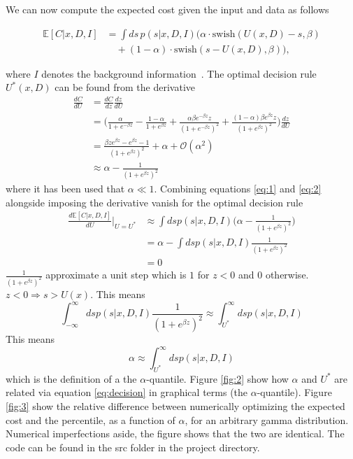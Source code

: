 \documentclass[a4paper,12pt]{article}
\theoremstyle{definition}
\begin{document}
	We can now compute the expected cost given the input and data as follows
	
	\begin{equation}
		\begin{split}
			\mathbb{E}[C | x, D, I] & = \int ds \, p(s | x, D, I) \bigg( \alpha \cdot \text{swish}(U(x,D) - s, \beta) \\
			& \quad + (1 - \alpha) \cdot \text{swish}(s - U(x,D), \beta) \bigg),
		\end{split}
		\label{eq:1}
	\end{equation}
	
	where $I$ denotes the background information~\citep{Sivia2006}. The optimal decision rule $U^*(x,D)$ can be found from the derivative
	\begin{equation}
		\begin{split}
			\frac{dC}{dU} & = \frac{dC}{dz}\frac{dz}{dU}\\
			& = \bigg(\frac{\alpha}{1+e^{-\beta z}}-\frac{1-\alpha}{1+e^{\beta z}}+\frac{\alpha\beta e^{-\beta z}z}{(1+e^{-\beta z})^2}+\frac{(1-\alpha)\beta e^{\beta z}z}{(1+e^{\beta z})^2}\bigg)\frac{dz}{dU}\\
			&= \frac{\beta z e^{\beta z}-e^{\beta z}-1}{(1+e^{\beta z})^2}+\alpha+\mathcal{O}(\alpha^2)\\
			&\approx  \alpha -\frac{1}{(1+e^{\beta z})^2}
		\end{split}
		\label{eq:2}
	\end{equation}
	where it has been used that $\alpha\ll 1$. Combining equations \eqref{eq:1} and \eqref{eq:2} alongside imposing the derivative vanish for the optimal decision rule
	\begin{equation}
		\begin{split}
			\frac{d\mathbb{E}[C|x,D,I ]}{dU}\bigg|_{U=U^*} &\approx \int ds p(s|x,D,I) \bigg(\alpha -\frac{1}{(1+e^{\beta z})^2}\bigg)\\
			& = \alpha -\int ds p(s|x,D,I)\frac{1}{(1+e^{\beta z})^2}\\
			& = 0
		\end{split}
	\end{equation}
	$\frac{1}{(1+e^{\beta z})^2}$ approximate a unit step which is $1$ for $z<0$ and $0$ otherwise. $z<0 \Rightarrow s>U(x)$. This means
	\begin{equation}
		\int_{-\infty}^{\infty} ds p(s|x,D,I)\frac{1}{(1+e^{\beta z})^2} \approx \int_{U^*}^{\infty} ds p(s|x,D,I)
	\end{equation}
	This means
	\begin{equation}
		\alpha \approx \int_{U^*}^{\infty} ds p(s|x,D,I)
		\label{eq:decision}
	\end{equation}
	which is the definition of a the $\alpha$-quantile. Figure \ref{fig:2} show how $\alpha$ and $U^*$ are related via equation \eqref{eq:decision} in graphical terms (the $\alpha$-quantile). Figure \ref{fig:3} show the relative difference between numerically optimizing the expected cost and the percentile, as a function of $\alpha$, for an arbitrary gamma distribution. Numerical imperfections aside, the figure shows that the two are identical. The code can be found in the src folder in the project directory.
	
\end{document}
